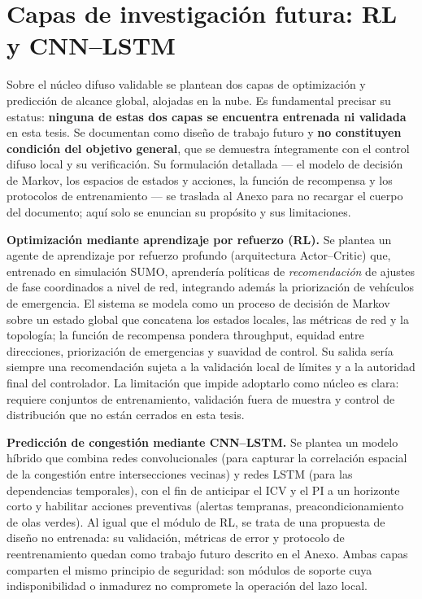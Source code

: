 \section{Capas de investigación futura: RL y CNN--LSTM}\label{sec:capas-futuras}

Sobre el núcleo difuso validable se plantean dos capas de optimización y predicción de alcance
global, alojadas en la nube. Es fundamental precisar su estatus: \textbf{ninguna de estas dos
capas se encuentra entrenada ni validada} en esta tesis. Se documentan como diseño de trabajo
futuro y \textbf{no constituyen condición del objetivo general}, que se demuestra íntegramente
con el control difuso local y su verificación. Su formulación detallada --- el modelo de
decisión de Markov, los espacios de estados y acciones, la función de recompensa y los
protocolos de entrenamiento --- se traslada al Anexo para no recargar el cuerpo del documento;
aquí solo se enuncian su propósito y sus limitaciones.

\textbf{Optimización mediante aprendizaje por refuerzo (RL).} Se plantea un agente de
aprendizaje por refuerzo profundo (arquitectura Actor--Critic) que, entrenado en simulación
SUMO, aprendería políticas de \emph{recomendación} de ajustes de fase coordinados a nivel de
red, integrando además la priorización de vehículos de emergencia. El sistema se modela como un
proceso de decisión de Markov sobre un estado global que concatena los estados locales, las
métricas de red y la topología; la función de recompensa pondera throughput, equidad entre
direcciones, priorización de emergencias y suavidad de control. Su salida sería siempre una
recomendación sujeta a la validación local de límites y a la autoridad final del controlador.
La limitación que impide adoptarlo como núcleo es clara: requiere conjuntos de entrenamiento,
validación fuera de muestra y control de distribución que no están cerrados en esta tesis.

\textbf{Predicción de congestión mediante CNN--LSTM.} Se plantea un modelo híbrido que combina
redes convolucionales (para capturar la correlación espacial de la congestión entre
intersecciones vecinas) y redes LSTM (para las dependencias temporales), con el fin de anticipar
el ICV y el PI a un horizonte corto y habilitar acciones preventivas (alertas tempranas,
preacondicionamiento de olas verdes). Al igual que el módulo de RL, se trata de una propuesta de
diseño no entrenada: su validación, métricas de error y protocolo de reentrenamiento quedan como
trabajo futuro descrito en el Anexo. Ambas capas comparten el mismo principio de seguridad: son
módulos de soporte cuya indisponibilidad o inmadurez no compromete la operación del lazo local.

